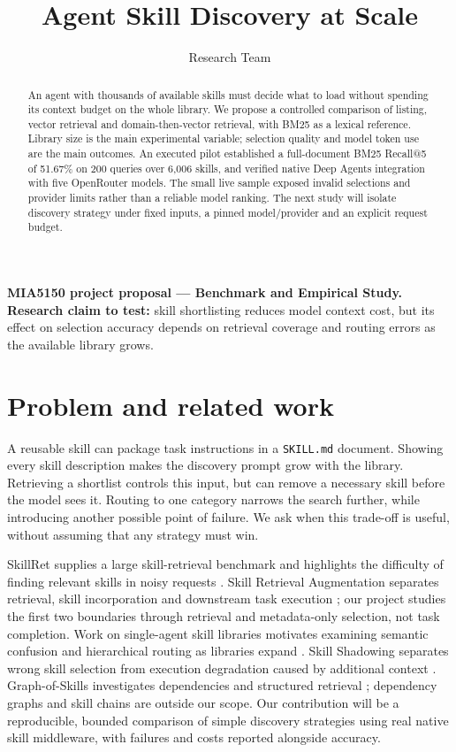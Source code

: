 \documentclass{article}
\title{Agent Skill Discovery at Scale}
\author{Research Team}
\begin{document}
\maketitle

\begin{abstract}
An agent with thousands of available skills must decide what to load without
spending its context budget on the whole library. We propose a controlled
comparison of listing, vector retrieval and domain-then-vector retrieval, with
BM25 as a lexical reference. Library size is the main experimental variable;
selection quality and model token use are the main outcomes. An executed pilot
established a full-document BM25 Recall@5 of 51.67\% on 200 queries over 6,006
skills, and verified native Deep Agents integration with five OpenRouter models.
The small live sample exposed invalid selections and provider limits rather than
a reliable model ranking. The next study will isolate discovery strategy under
fixed inputs, a pinned model/provider and an explicit request budget.
\end{abstract}

\noindent\textbf{MIA5150 project proposal --- Benchmark and Empirical Study.}
\textbf{Research claim to test:} skill shortlisting reduces model context cost,
but its effect on selection accuracy depends on retrieval coverage and routing
errors as the available library grows.

\section{Problem and related work}
A reusable skill can package task instructions in a \texttt{SKILL.md} document.
Showing every skill description makes the discovery prompt grow with the library.
Retrieving a shortlist controls this input, but can remove a necessary skill
before the model sees it. Routing to one category narrows the search further,
while introducing another possible point of failure. We ask when this trade-off
is useful, without assuming that any strategy must win.

SkillRet supplies a large skill-retrieval benchmark and highlights the difficulty
of finding relevant skills in noisy requests \citep{kang2026skillret}. Skill
Retrieval Augmentation separates retrieval, skill incorporation and downstream
task execution \citep{su2026skill}; our project studies the first two boundaries
through retrieval and metadata-only selection, not task completion.
Work on single-agent skill libraries motivates examining semantic confusion and
hierarchical routing as libraries expand \citep{li2026single}. Skill Shadowing
separates wrong skill selection from execution degradation caused by additional
context \citep{song2026shadowing}. Graph-of-Skills investigates dependencies and
structured retrieval \citep{liu2026graph}; dependency graphs and skill chains are
outside our scope. Our contribution will be a reproducible, bounded comparison
of simple discovery strategies using real native skill middleware, with failures
and costs reported alongside accuracy.
\end{document}
